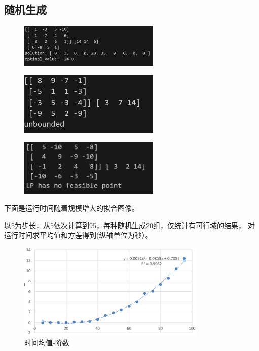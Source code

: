 \documentclass[10pt,a4paper,oneside]{article}
\begin{document}
\subsection{随机生成}

\begin{figure}[H]
    \centering
    \includegraphics[width=0.6\textwidth]{屏幕截图 2024-11-05 114636.png}
\end{figure}

\begin{figure}[H]
    \centering
    \includegraphics[width=0.6\textwidth]{屏幕截图 2024-11-05 114620.png}
\end{figure}

\begin{figure}[H]
    \centering
    \includegraphics[width=0.6\textwidth]{屏幕截图 2024-11-05 114615.png}
\end{figure}

下面是运行时间随着规模增大的拟合图像。

以5为步长，从5依次计算到95，每种随机生成20组，仅统计有可行域的结果，
对运行时间求平均值和方差得到(纵轴单位为秒）。
\begin{figure}[H]
    \centering
    \includegraphics[width=0.8\textwidth]{屏幕截图 2024-11-05 150227.png}
	\caption{时间均值-阶数}
\end{figure}
\end{document}
